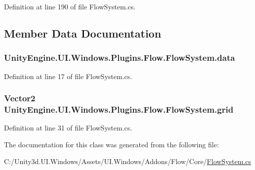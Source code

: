 Definition at line 190 of file Flow\+System.\+cs.



\subsection{Member Data Documentation}
\hypertarget{class_unity_engine_1_1_u_i_1_1_windows_1_1_plugins_1_1_flow_1_1_flow_system_a631b58fb3f6a04bf6501aee2a8131821}{}
\subsubsection[{data}]{ Unity\+Engine.\+U\+I.\+Windows.\+Plugins.\+Flow.\+Flow\+System.\+data}\label{class_unity_engine_1_1_u_i_1_1_windows_1_1_plugins_1_1_flow_1_1_flow_system_a631b58fb3f6a04bf6501aee2a8131821}


Definition at line 17 of file Flow\+System.\+cs.

\hypertarget{class_unity_engine_1_1_u_i_1_1_windows_1_1_plugins_1_1_flow_1_1_flow_system_adbddeea8bdc50ae389415b89ce6a950f}{}
\subsubsection[{grid}]{\setlength{\rightskip}{0pt plus 5cm}Vector2 Unity\+Engine.\+U\+I.\+Windows.\+Plugins.\+Flow.\+Flow\+System.\+grid\hspace{0.3cm}{\ttfamily [static]}}\label{class_unity_engine_1_1_u_i_1_1_windows_1_1_plugins_1_1_flow_1_1_flow_system_adbddeea8bdc50ae389415b89ce6a950f}


Definition at line 31 of file Flow\+System.\+cs.



The documentation for this class was generated from the following file\+:\begin{DoxyCompactItemize}
\item 
C\+:/\+Unity3d.\+U\+I.\+Windows/\+Assets/\+U\+I.\+Windows/\+Addons/\+Flow/\+Core/\hyperlink{_flow_system_8cs}{Flow\+System.\+cs}\end{DoxyCompactItemize}

